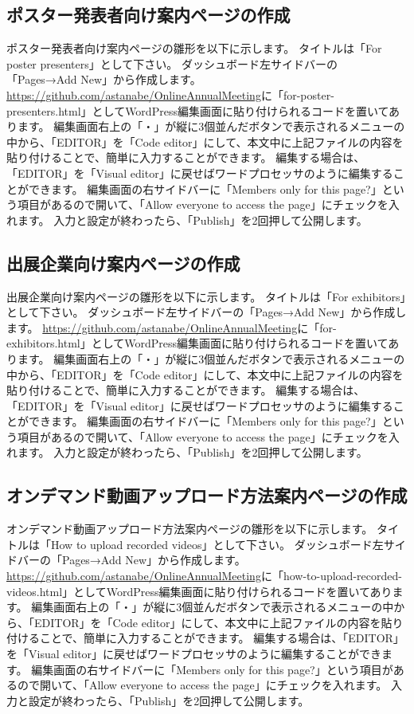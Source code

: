 \documentclass[titlepage,10pt,a4paper,uplatex]{jsbook}
\begin{document}
\subsection{ポスター発表者向け案内ページの作成}

ポスター発表者向け案内ページの雛形を以下に示します。
タイトルは「For poster presenters」として下さい。
ダッシュボード左サイドバーの「Pages→Add New」から作成します。
\url{https://github.com/astanabe/OnlineAnnualMeeting}に「for-poster-presenters.html」としてWordPress編集画面に貼り付けられるコードを置いてあります。
編集画面右上の「・」が縦に3個並んだボタンで表示されるメニューの中から、「EDITOR」を「Code editor」にして、本文中に上記ファイルの内容を貼り付けることで、簡単に入力することができます。
編集する場合は、「EDITOR」を「Visual editor」に戻せばワードプロセッサのように編集することができます。
編集画面の右サイドバーに「Members only for this page?」という項目があるので開いて、「Allow everyone to access the page」にチェックを入れます。
入力と設定が終わったら、「Publish」を2回押して公開します。

\subsection{出展企業向け案内ページの作成}

出展企業向け案内ページの雛形を以下に示します。
タイトルは「For exhibitors」として下さい。
ダッシュボード左サイドバーの「Pages→Add New」から作成します。
\url{https://github.com/astanabe/OnlineAnnualMeeting}に「for-exhibitors.html」としてWordPress編集画面に貼り付けられるコードを置いてあります。
編集画面右上の「・」が縦に3個並んだボタンで表示されるメニューの中から、「EDITOR」を「Code editor」にして、本文中に上記ファイルの内容を貼り付けることで、簡単に入力することができます。
編集する場合は、「EDITOR」を「Visual editor」に戻せばワードプロセッサのように編集することができます。
編集画面の右サイドバーに「Members only for this page?」という項目があるので開いて、「Allow everyone to access the page」にチェックを入れます。
入力と設定が終わったら、「Publish」を2回押して公開します。

\subsection{オンデマンド動画アップロード方法案内ページの作成}

オンデマンド動画アップロード方法案内ページの雛形を以下に示します。
タイトルは「How to upload recorded videos」として下さい。
ダッシュボード左サイドバーの「Pages→Add New」から作成します。
\url{https://github.com/astanabe/OnlineAnnualMeeting}に「how-to-upload-recorded-videos.html」としてWordPress編集画面に貼り付けられるコードを置いてあります。
編集画面右上の「・」が縦に3個並んだボタンで表示されるメニューの中から、「EDITOR」を「Code editor」にして、本文中に上記ファイルの内容を貼り付けることで、簡単に入力することができます。
編集する場合は、「EDITOR」を「Visual editor」に戻せばワードプロセッサのように編集することができます。
編集画面の右サイドバーに「Members only for this page?」という項目があるので開いて、「Allow everyone to access the page」にチェックを入れます。
入力と設定が終わったら、「Publish」を2回押して公開します。
\end{document}
